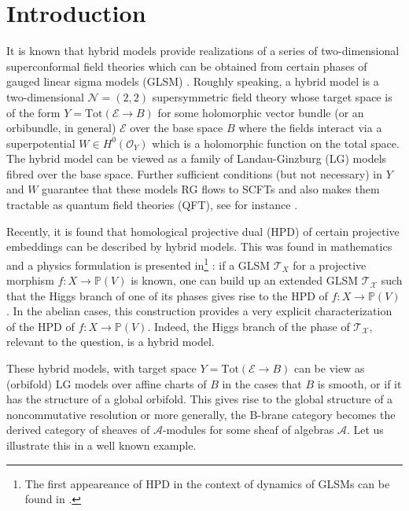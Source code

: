 \documentclass[a4paper,11pt]{article}
\numberwithin{equation}{section}
\begin{document}
\section{Introduction}

It is known that hybrid models provide realizations of a series of 
two-dimensional superconformal field theories which can be obtained from certain 
phases of gauged linear sigma models (GLSM) \cite{Witten:1993yc}. Roughly 
speaking, a hybrid model is a two-dimensional $\mathcal{N}=(2,2)$ 
supersymmetric field theory whose target space is of the form 
$Y=\mathrm{Tot}(\mathcal{E}\rightarrow B)$ for some holomorphic vector bundle 
(or an orbibundle, in general) $\mathcal{E}$ over the base space $B$ where the 
fields interact via a superpotential $W\in H^{0}(\mathcal{O}_{Y})$ which is a 
holomorphic function on the total space. The hybrid model can be viewed as a 
family of Landau-Ginzburg (LG) models fibred over the base space. Further 
sufficient conditions (but not necessary) in $Y$ and $W$ guarantee that these 
models RG flows to SCFTs and also makes them tractable as quantum field 
theories (QFT), see for instance \cite{Aspinwall:2009qy,Bertolini:2013xga}.

Recently, it is found that homological projective dual (HPD) 
\cite{kuznetsov2007homological} of certain projective embeddings can be 
described by hybrid models. This was found in 
mathematics \cite{ballard2017homological,rennemo2017fundamental} and a physics 
formulation is presented in\footnote{The first appeareance of HPD in the 
context of dynamics of GLSMs can be found in \cite{Caldararu:2007tc}.} 
\cite{Chen:2020iyo}: if a GLSM 
$\mathcal{T}_{X}$ for a projective morphism 
$f:X\rightarrow\mathbb{P}(V)$ is known, one can build up an extended GLSM 
$\mathcal{T}_{\mathcal{X}}$ such that the Higgs branch of one of its phases 
gives rise to the HPD of $f:X\rightarrow\mathbb{P}(V)$. In the abelian 
cases, this construction provides a very explicit characterization of the HPD 
of $f:X\rightarrow\mathbb{P}(V)$. Indeed, the Higgs 
branch of the phase of $\mathcal{T}_{\mathcal{X}}$, relevant to the question, 
is a hybrid model.

These hybrid models, with target space $Y=\mathrm{Tot}(\mathcal{E}\rightarrow 
B)$ can be view as (orbifold) LG models over affine charts of $B$ in the cases 
that $B$ is smooth, or if it has the structure of a global orbifold. This gives 
rise to the global structure of a noncommutative resolution or more generally, 
the B-brane category becomes the derived category of sheaves of 
$\mathcal{A}$-modules for some sheaf of algebras $\mathcal{A}$. Let us 
illustrate 
this in a well known example.
\end{document}
